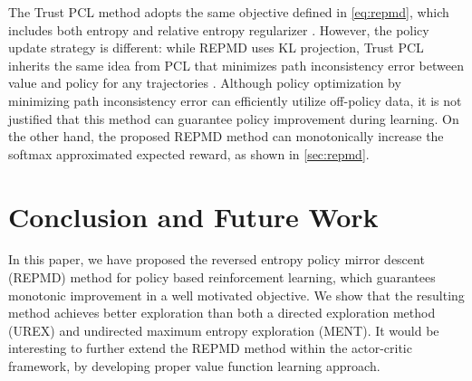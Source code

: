 \documentclass{article}
\begin{document}
The Trust PCL method adopts the same objective defined in \cref{eq:repmd}, which includes both entropy and relative entropy regularizer \cite{nachum2017trust}. However, the policy update strategy is different: while REPMD uses KL projection, Trust PCL inherits the same idea from PCL that minimizes path inconsistency error between value and policy for any trajectories \cite{nachum2017bridging}. Although policy optimization by minimizing path inconsistency error can efficiently utilize off-policy data, it is not justified that this method can guarantee policy improvement during learning. On the other hand, the proposed REPMD method can monotonically increase the softmax approximated expected reward, as shown in \cref{sec:repmd}.

\section{Conclusion and Future Work}

In this paper, we have proposed the reversed entropy policy mirror descent (REPMD) method for policy based reinforcement learning, which guarantees monotonic improvement in a well motivated objective. We show that the resulting method achieves better exploration than both a directed exploration method (UREX) and undirected maximum entropy exploration (MENT). It would be interesting to further extend the REPMD method within the actor-critic framework, by developing proper value function learning approach. %


{\small


}
\end{document}
